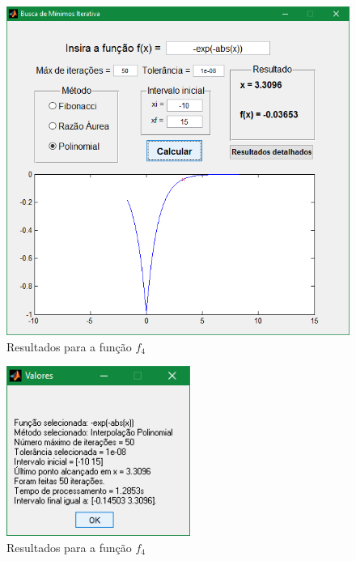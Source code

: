 \begin{figure}[H]
	\begin{center}	
		\includegraphics[width=14cm]{../interpol/f4_gui.PNG}
		\caption{Resultados para a função $f_4$}
		\label{fig:f4_gui}
	\end{center}
\end{figure}

\begin{figure}[H]
	\begin{center}	
		\includegraphics[width=6cm]{../interpol/f4_resultados.PNG}
		\caption{Resultados para a função $f_4$}
		\label{fig:f4_resultados}
	\end{center}
\end{figure}

